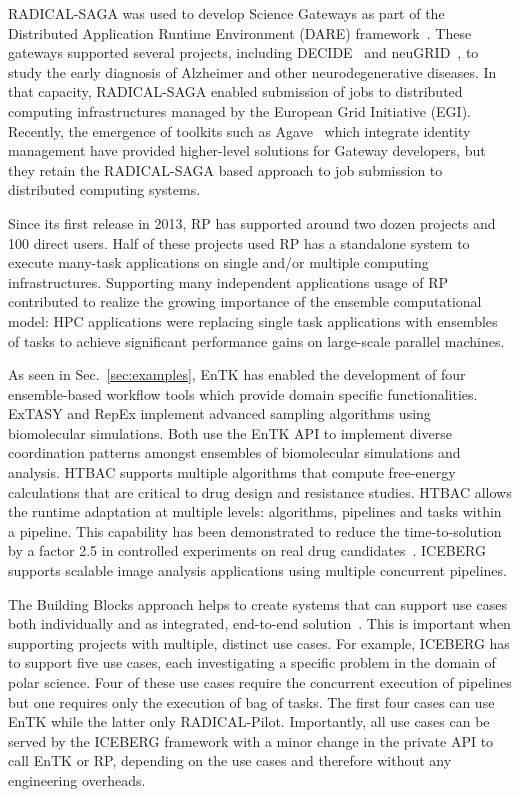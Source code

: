 \documentclass[preprint,12pt, a4paper]{elsarticle}
\begin{document}
RADICAL-SAGA was used to develop Science Gateways as part of the Distributed
Application Runtime Environment (DARE)
framework~\cite{maddineni2012distributed}. These gateways supported several
projects, including DECIDE~\cite{decide} and neuGRID~\cite{redolfi2009grid},
to study the early diagnosis of Alzheimer and other neurodegenerative
diseases. In that capacity, RADICAL-SAGA enabled submission of jobs to
distributed computing infrastructures managed by the European Grid Initiative
(EGI). Recently, the emergence of toolkits such as
Agave~\cite{dooley2012software} which integrate identity management have
provided higher-level solutions for Gateway developers, but they retain the
RADICAL-SAGA based approach to job submission to distributed computing
systems.

Since its first release in 2013, RP has supported around two dozen projects
and 100 direct users. Half of these projects used RP has a standalone system
to execute many-task applications on single and/or multiple computing
infrastructures. Supporting many independent applications usage of RP
contributed to realize the growing importance of the ensemble computational
model: HPC applications were replacing single task applications with
ensembles of tasks to achieve significant performance gains on large-scale
parallel machines.

As seen in Sec.~\ref{sec:examples}, EnTK has enabled the development of four
ensemble-based workflow tools which provide domain specific functionalities.
ExTASY and RepEx implement advanced sampling algorithms using biomolecular
simulations. Both use the EnTK API to implement  diverse coordination
patterns amongst ensembles of biomolecular simulations and analysis. HTBAC
supports multiple algorithms that compute free-energy calculations that are
critical to drug design and resistance studies. HTBAC allows the runtime
adaptation at multiple levels: algorithms, pipelines and tasks within a
pipeline. This capability has been demonstrated to reduce the
time-to-solution by a factor 2.5 in controlled experiments on real drug
candidates~\citep{dakka2018concurrent}. ICEBERG supports scalable image
analysis applications using multiple concurrent pipelines.

The Building Blocks approach helps to create systems that can support use
cases both individually and as integrated, end-to-end
solution~\cite{turilli2019middleware}. This is important when supporting
projects with multiple, distinct use cases. For example, ICEBERG has to
support five use cases, each investigating a specific problem in the domain
of polar science. Four of these use cases require the concurrent execution of
pipelines but one requires only the execution of bag of tasks. The first four
cases can use EnTK while the latter only RADICAL-Pilot. Importantly, all use
cases can be served by the ICEBERG framework with a minor change in the
private API to call EnTK or RP, depending on the use cases and therefore
without any engineering overheads.
\end{document}
